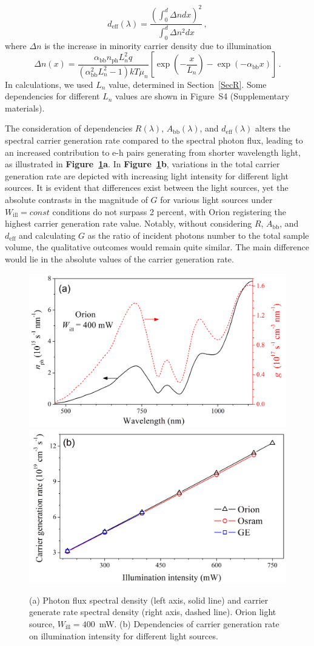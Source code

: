 \documentclass{WileyMSP-template}
\begin{document}
\begin{equation}
\label{eqdeff}
d_\mathrm{eff}(\lambda)=\frac{\left(\int_0^d \Delta n dx\right)^2}{\int_0^d \Delta n^2 dx}\,,
\end{equation}
where
$\Delta n$ is the increase in minority carrier density due to illumination
\begin{equation}
\label{eqdeln}
\Delta n (x)=\frac{\alpha_\mathrm{bb} n_\mathrm{ph} L_n^2 q}{(\alpha_\mathrm{bb}^2 L_n^2-1)kT\mu_n}
\left[\exp\left(-\frac{x}{L_n}\right)-\exp\left(-\alpha_\mathrm{bb} x\right)\right]\,.
\end{equation}
In calculations, we used $L_n$ value, determined in Section~\ref{SecR}.
Some dependencies for different $L_n$ values are shown in Figure~S4 (Supplementary materials).

The consideration of dependencies $R(\lambda)$, $A_\mathrm{bb}(\lambda)$, and $d_\mathrm{eff}(\lambda)$ alters
the spectral carrier generation rate compared to the spectral photon flux,
leading to an increased contribution to e-h pairs generating from shorter wavelength light,
as illustrated in \textbf{Figure~\ref{fig5}a}.
In \textbf{Figure~\ref{fig5}b}, variations in the total carrier generation rate are depicted with increasing light intensity for different light sources.
It is evident that differences exist between the light sources,
yet the absolute contrasts in the magnitude of $G$ for various light sources under $W_\mathrm{ill}=const$ conditions do not surpass 2 percent,
with Orion registering the highest carrier generation rate value.
Notably, without considering $R$, $A_\mathrm{bb}$, and $d_\mathrm{eff}$ and calculating $G$  as the ratio of incident photons number
to the total sample volume, the qualitative outcomes would remain quite similar. The main difference would lie in the absolute values of the carrier generation rate.

\begin{figure}
\centering
  \includegraphics[width=0.4\linewidth]{Fig5a.png}
  \includegraphics[width=0.4\linewidth]{Fig5b.png}
  \caption{
  (a) Photon flux spectral density (left axis, solid line) and carrier generate rate spectral density (right axis, dashed line).
  Orion light source, $W_\mathrm{ill}=400$~mW.
  (b) Dependencies of carrier generation rate on illumination intensity for different light sources.
  }
  \label{fig5}
\end{figure}
\end{document}
